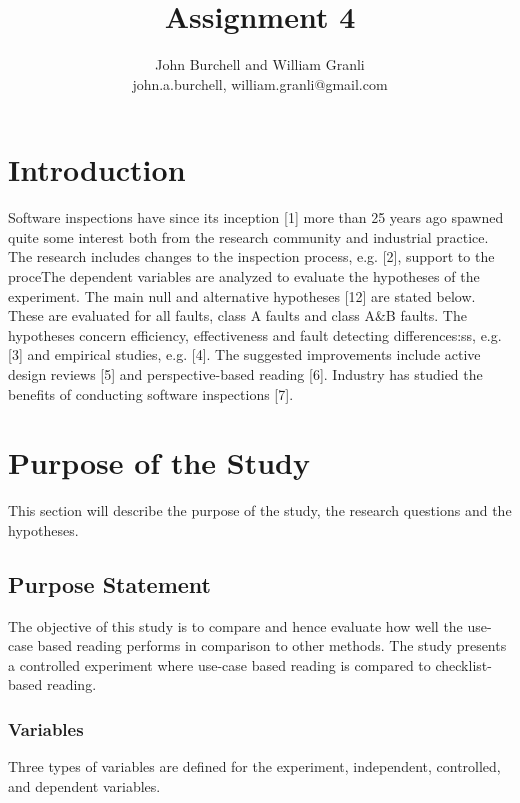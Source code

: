 \documentclass[10pt,twocolumn]{article}
\begin{document}
\title{Assignment 4}

\author{John Burchell and William Granli \\
john.a.burchell, william.granli@gmail.com}


\maketitle
\thispagestyle{empty}


\section{Introduction}
Software inspections have since its inception [1] more than
25 years ago spawned quite some interest both from the
research community and industrial practice. The research
includes changes to the inspection process, e.g. [2], support to
the proceThe dependent variables are analyzed to evaluate the
hypotheses of the experiment. The main null and alternative
hypotheses [12] are stated below. These are evaluated for all
faults, class A faults and class A\&B faults. The hypotheses
concern efficiency, effectiveness and fault detecting
differences:ss, e.g. [3] and empirical studies, e.g. [4]. The
suggested improvements include active design reviews [5] and
perspective-based reading [6]. Industry has studied the
benefits of conducting software inspections [7].

\section{Purpose of the Study}
This section will describe the purpose of the study, the research questions and the hypotheses. 

\subsection{Purpose Statement}
The objective of this study is to compare and hence
evaluate how well the use-case based reading performs in
comparison to other methods. The study presents a controlled
experiment where use-case based reading is compared to
checklist-based reading.

\subsubsection{Variables}
Three types of variables are defined for the experiment,
independent, controlled, and dependent variables.
\end{document}

